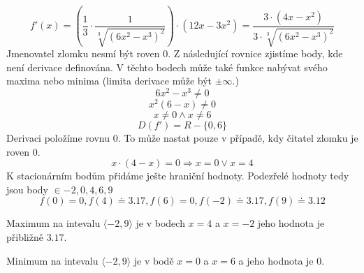 \begin{displaymath}
f'(x)=\left(\frac{1}{3}\cdot\frac{1}{\sqrt[3]{(6x^2-x^3)^2}}\right)\cdot(12x-3x^2)=\frac{3\cdot(4x-x^2)}{3\cdot\sqrt[3]{(6x^2-x^3)^2}}
\end{displaymath}
Jmenovatel zlomku nesmí být roven 0. Z následující rovnice zjistíme body, kde není derivace definována. V těchto bodech může také funkce nabývat svého maxima nebo minima (limita derivace může být $\pm \infty$.)
\begin{displaymath}
6x^2-x^3\neq0
\end{displaymath}
\begin{displaymath}
x^2(6-x)\neq0
\end{displaymath}
\begin{displaymath}
x\neq0 \wedge  x\neq6
\end{displaymath}
\begin{displaymath}
D(f')=R-\{0,6\}
\end{displaymath}
Derivaci položíme rovnu 0. To může nastat pouze v případě, kdy čitatel zlomku je roven 0.
\begin{displaymath}
x\cdot(4-x) = 0 \Rightarrow x = 0 \vee x = 4
\end{displaymath}
K stacionárním bodům přidáme ješte hraniční hodnoty. 
Podezřelé hodnoty tedy jsou body $ \in{-2,0,4,6,9} $
\begin{displaymath}
f(0) = 0, f(4) \doteq 3.17, f(6) = 0, f(-2) \doteq 3.17, f(9) \doteq 3.12
\end{displaymath}

Maximum na intevalu $ \langle-2,9\rangle$ je v bodech $x=4$ a $x=-2$ jeho hodnota je přibližně $3.17$.

Minimum na intevalu $ \langle-2,9\rangle$ je v bodě $x=0$ a $x=6$ a jeho hodnota je $0$.
